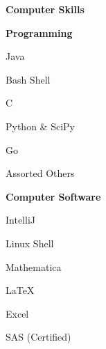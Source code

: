 \documentclass[a4paper,12pt,final]{memoir}
\newcommand{\Sep}{\vspace{1.5em}}
\newcommand{\SmallSep}{\vspace{0.5em}}
\newcommand{\CVSection}[1]
	{\Large\textbf{#1}\par
	\SmallSep\normalsize\normalfont}
\newcommand{\CVItem}[1]
	{\textbf{\color{RoyalBlue} #1}}
\begin{document}
\Sep

\CVSection{Computer Skills}
\CVItem{Programming}
\begin{multicols}{3}
	\begin{compactitem}[\color{RoyalBlue}$\circ$]
		\item Java
		\item Bash Shell
		\item C
		\item Python \& SciPy
		\item Go
		\item Assorted Others
	\end{compactitem}
\end{multicols}
\SmallSep

\CVItem{Computer Software}
\begin{multicols}{3}
	\begin{compactitem}[\color{RoyalBlue}$\circ$]
		\item IntelliJ
		\item Linux Shell
		\item Mathematica
		\item LaTeX
		\item Excel
		\item SAS (Certified)
	\end{compactitem}
\end{multicols}



\end{document}
